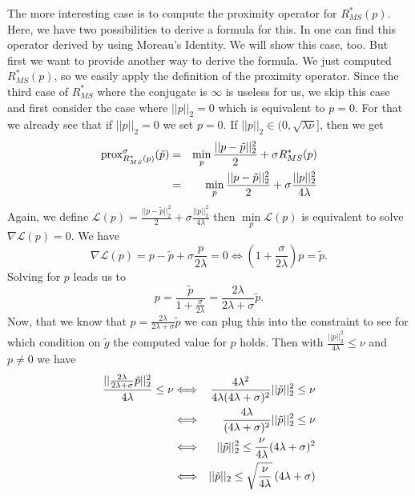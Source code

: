         The more interesting case is to compute the proximity operator for $R_{MS}^{\ast}(p)$. Here, we have two possibilities to derive a formula for this. In \cite{Strekalovskiy-Cremers-eccv14} one can find this operator derived by using Moreau's Identity. We will show this case, too. But first we want to provide another way to derive the formula. We just computed $R_{MS}^{\ast}(p)$, so we easily apply the definition of the proximity operator. Since the third case of $R_{MS}^{\ast}$ where the conjugate is $\infty$ is useless for us, we skip this case and first consider the case where $||p||_{2} = 0$ which is equivalent to $p = 0$. For that we already see that if $||p||_{2} = 0$ we set $p = 0$. If $||p||_{2} \in (0, \sqrt{\lambda \nu}]$, then we get
            \begin{eqnarray}
                \textnormal{prox}_{R_{MS}^{\ast}(p)}^{\sigma}(\tilde{p}) &=& \min_{p} \frac{||p - \tilde{p}||_{2}^{2}}{2} + \sigma R_{MS}^{\ast}(p) \notag \\
                &=& \min_{p} \frac{||p - \tilde{p}||_{2}^{2}}{2} + \sigma \frac{||p||_{2}^{2}}{4\lambda} \notag
            \end{eqnarray}
        Again, we define $\mathcal{L}(p) = \frac{||p - \tilde{p}||_{2}^{2}}{2} + \sigma \frac{||p||_{2}^{2}}{4\lambda}$ then $\min\limits_{p} \mathcal{L}(p)$ is equivalent to solve $\nabla \mathcal{L}(p) = 0$. We have
            $$
                \nabla \mathcal{L}(p) = p - \tilde{p} + \sigma \frac{p}{2\lambda} = 0 \Longleftrightarrow (1 + \frac{\sigma}{2\lambda}) p = \tilde{p}.
            $$
        Solving for $p$ leads us to
            $$
                p = \frac{\tilde{p}}{1 + \frac{\sigma}{2\lambda}} = \frac{2\lambda}{2\lambda + \sigma} \tilde{p}.
            $$
        Now, that we know that $p = \frac{2\lambda}{2\lambda + \sigma} \tilde{p}$ we can plug this into the constraint to see for which condition on $\tilde{g}$ the computed value for $p$ holds. Then with $\frac{||p||_{2}^{2}}{4\lambda} \le \nu$ and $p \ne 0$ we have
            \begin{eqnarray}
                \frac{||\frac{2\lambda}{2\lambda + \sigma} \tilde{p}||_{2}^{2}}{4\lambda} \le \nu &\Longleftrightarrow& \frac{4\lambda^{2}}{4\lambda(4\lambda + \sigma)^{2}} ||\tilde{p}||_{2}^{2} \le \nu \notag \\
                &\Longleftrightarrow& \frac{4\lambda}{(4\lambda + \sigma)^{2}} ||\tilde{p}||_{2}^{2} \le \nu \notag \\
                &\Longleftrightarrow& ||\tilde{p}||_{2}^{2} \le \frac{\nu}{4\lambda} (4\lambda + \sigma)^{2} \notag \\
                &\Longleftrightarrow& ||\tilde{p}||_{2} \le \sqrt{\frac{\nu}{4\lambda}} \, (4\lambda + \sigma) \notag
            \end{eqnarray}
